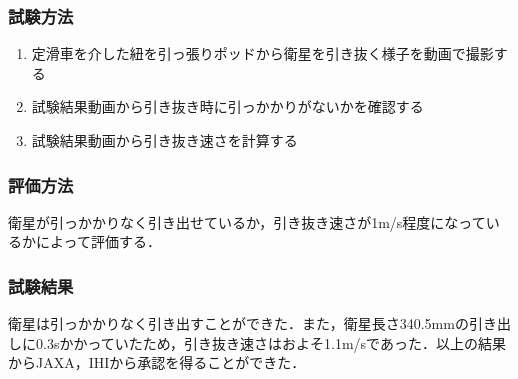 \subsubsection{試験方法}

\begin{enumerate}
\item 定滑車を介した紐を引っ張りポッドから衛星を引き抜く様子を動画で撮影する
\item 試験結果動画から引き抜き時に引っかかりがないかを確認する
\item 試験結果動画から引き抜き速さを計算する
\end{enumerate}

\subsubsection{評価方法}

衛星が引っかかりなく引き出せているか，引き抜き速さが1m/s程度になっているかによって評価する．

\subsubsection{試験結果}

衛星は引っかかりなく引き出すことができた．また，衛星長さ340.5mmの引き出しに0.3sかかっていたため，引き抜き速さはおよそ1.1m/sであった．以上の結果からJAXA，IHIから承認を得ることができた．